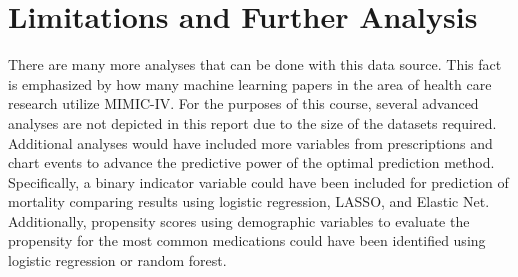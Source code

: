 \documentclass{article}
\begin{document}
\section{Limitations and Further Analysis}
There are many more analyses that can be done with this data source. This fact is emphasized by how many machine learning papers in the area of health care research utilize MIMIC-IV. For the purposes of this course, several advanced analyses are not depicted in this report due to the size of the datasets required. Additional analyses would have included more variables from prescriptions and chart events to advance the predictive power of the optimal prediction method. Specifically, a binary indicator variable could have been included for prediction of mortality comparing results using logistic regression, LASSO, and Elastic Net. Additionally, propensity scores using demographic variables to evaluate the propensity for the most common medications could have been identified using logistic regression or random forest. 
\end{document}
